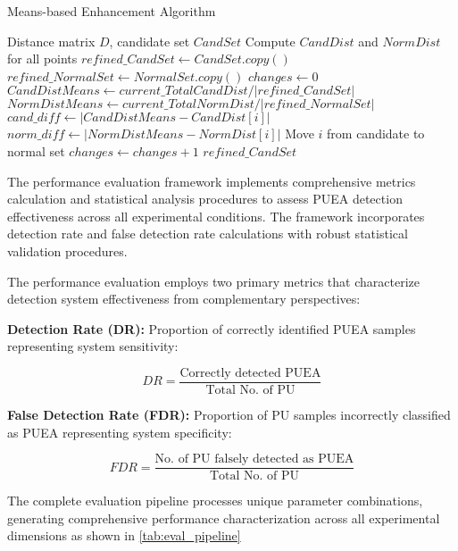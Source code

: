 \begin{algorithm}
\caption{Means-based Enhancement Algorithm}
\label{alg:means_enhancement}
\begin{algorithmic}[1]
\REQUIRE Distance matrix $D$, candidate set $CandSet$
\STATE Compute $CandDist$ and $NormDist$ for all points
\STATE $refined\_CandSet \leftarrow CandSet.copy()$
\STATE $refined\_NormalSet \leftarrow NormalSet.copy()$
\REPEAT
    \STATE $changes \leftarrow 0$
        \STATE $CandDistMeans \leftarrow current\_TotalCandDist / |refined\_CandSet|$
        \STATE $NormDistMeans \leftarrow current\_TotalNormDist / |refined\_NormalSet|$
        \STATE $cand\_diff \leftarrow |CandDistMeans - CandDist[i]|$
        \STATE $norm\_diff \leftarrow |NormDistMeans - NormDist[i]|$
            \STATE Move $i$ from candidate to normal set
            \STATE $changes \leftarrow changes + 1$
        \ENDIF
    \ENDFOR
{}
\RETURN $refined\_CandSet$
\end{algorithmic}
\end{algorithm}


The performance evaluation framework implements comprehensive metrics calculation and statistical analysis procedures to assess PUEA detection effectiveness across all experimental conditions. The framework incorporates detection rate and false detection rate calculations with robust statistical validation procedures.


The performance evaluation employs two primary metrics that characterize detection system effectiveness from complementary perspectives:

\textbf{Detection Rate (DR):} Proportion of correctly identified PUEA samples representing system sensitivity:

\begin{equation}
DR = \frac{\text{Correctly detected PUEA}}{\text{Total No. of PU}}
\end{equation}

\textbf{False Detection Rate (FDR):} Proportion of PU samples incorrectly classified as PUEA representing system specificity:

\begin{equation}
FDR = \frac{\text{No. of PU falsely detected as PUEA}}{\text{Total No. of PU}} 
\end{equation}

The complete evaluation pipeline processes unique parameter combinations, generating comprehensive performance characterization across all experimental dimensions as shown in \ref{tab:eval_pipeline}

